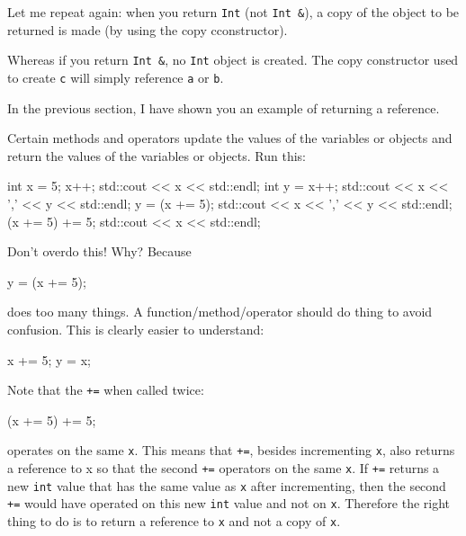 Let me repeat again: when you return \texttt{Int} (not \texttt{Int \&}), a
copy of the object to be returned is made (by using the copy
cconstructor).
\begin{consolethree}[escapeinside=||]
...
class Int
{
public:
    ...
    || max(const Int & c)
    {||
        return (c.x > x ? c : *this);
    }
    ...
private:
\end{consolethree}
Whereas if you return \texttt{Int \&}, no \texttt{Int} object is created.
The copy constructor used to create \texttt{c} will simply reference
\texttt{a} or \texttt{b}.


\newpage{}

In the previous section, I have shown you an example of returning a
reference.

Certain methods and operators update the values of the variables or
objects and return the values of the variables or objects. Run this:

\begin{consolethree}[escapeinside=||]
int x = 5;
x++;
std::cout << x << std::endl;
int y = x++;
std::cout << x << ',' << y << std::endl;
y = (x += 5);
std::cout << x << ',' << y << std::endl;
(x += 5) += 5;
std::cout << x << std::endl;
\end{consolethree}

Don't overdo this! Why? Because

\begin{consolethree}[escapeinside=||]
y = (x += 5);
\end{consolethree}

does too many things. A function/method/operator should do
 thing to avoid confusion. This is clearly easier to
understand:

\begin{consolethree}[escapeinside=||]
x += 5;
y = x;
\end{consolethree}

Note that the \texttt{+=} when called twice:

\begin{consolethree}[escapeinside=||]
(x += 5) += 5;
\end{consolethree}

operates on the same \texttt{x}. This means that \texttt{+=}, besides
incrementing \texttt{x}, also returns a reference to x so that the second
\texttt{+=} operators on the same \texttt{x}. If \texttt{+=} returns a new
\texttt{int} value that has the same value as \texttt{x} after incrementing,
then the second \texttt{+=} would have operated on this new \texttt{int}
value and not on \texttt{x}. Therefore the right thing to do is to return
a reference to \texttt{x} and not a copy of \texttt{x}.

